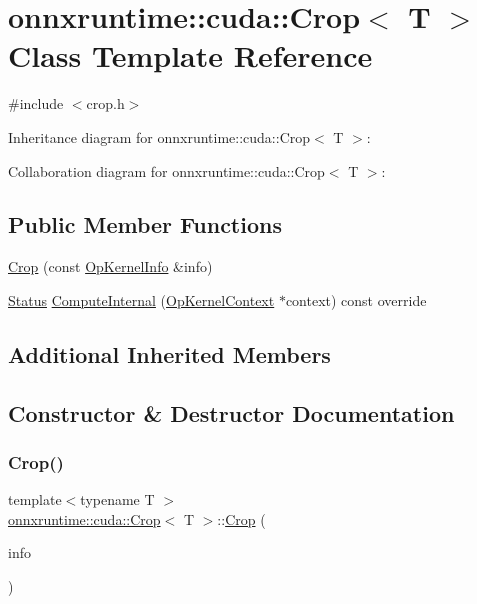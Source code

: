 \hypertarget{classonnxruntime_1_1cuda_1_1Crop}{}\section{onnxruntime\+:\+:cuda\+:\+:Crop$<$ T $>$ Class Template Reference}
\label{classonnxruntime_1_1cuda_1_1Crop}


{\ttfamily \#include $<$crop.\+h$>$}



Inheritance diagram for onnxruntime\+:\+:cuda\+:\+:Crop$<$ T $>$\+:


Collaboration diagram for onnxruntime\+:\+:cuda\+:\+:Crop$<$ T $>$\+:
\subsection*{Public Member Functions}
\begin{DoxyCompactItemize}
\item 
\mbox{\hyperlink{classonnxruntime_1_1cuda_1_1Crop_ac51ed39a33028b67cd6bab4f8daeee3c}{Crop}} (const \mbox{\hyperlink{classonnxruntime_1_1OpKernelInfo}{Op\+Kernel\+Info}} \&info)
\item 
\mbox{\hyperlink{classonnxruntime_1_1common_1_1Status}{Status}} \mbox{\hyperlink{classonnxruntime_1_1cuda_1_1Crop_a7a73bc65e6c7d7b71cfe0443f5576145}{Compute\+Internal}} (\mbox{\hyperlink{classonnxruntime_1_1OpKernelContext}{Op\+Kernel\+Context}} $\ast$context) const override
\end{DoxyCompactItemize}
\subsection*{Additional Inherited Members}


\subsection{Constructor \& Destructor Documentation}
\mbox{\label{classonnxruntime_1_1cuda_1_1Crop_ac51ed39a33028b67cd6bab4f8daeee3c}} 
\subsubsection{\texorpdfstring{Crop()}{Crop()}}
{\footnotesize\ttfamily template$<$typename T $>$ \\
\mbox{\hyperlink{classonnxruntime_1_1cuda_1_1Crop}{onnxruntime\+::cuda\+::\+Crop}}$<$ T $>$\+::\mbox{\hyperlink{classonnxruntime_1_1cuda_1_1Crop}{Crop}} (\begin{DoxyParamCaption}\item[{const \mbox{\hyperlink{classonnxruntime_1_1OpKernelInfo}{Op\+Kernel\+Info}} \&}]{info }\end{DoxyParamCaption})\hspace{0.3cm}{\ttfamily [inline]}}



